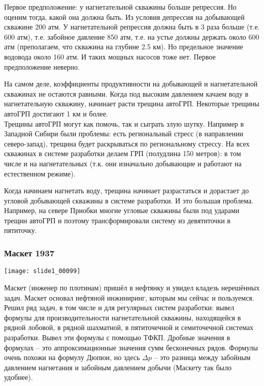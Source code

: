 \documentclass[main.tex]{subfiles}
\begin{document}
Первое предположение: у нагнетательной скважины больше репрессия. Но оценим тогда, какой она должна быть. Из условия депрессия на добывающей скважине 200 атм. У нагнетательной репрессия должна быть в 3 раза больше (т.е. 600 атм), т.е. забойное давление 850 атм, т.е. на устье должны держать около 600 атм (преполагаем, что скважина на глубине 2.5 км).
Но предельное значение водовода около 160 атм. И таких мощных насосов тоже нет. Первое предположение неверно.

На самом деле, коэффициенты продуктивности на добывающей и нагнетательной скважинах не остаются равными. Когда под высоким давлением качаем воду в нагнетательную скважину, начинает расти трещина автоГРП. Некоторые трещины автоГРП достигают 1 км и более.\\

Трещины автоГРП могут как помочь, так и сыграть злую шутку.
Например в Западной Сибири были проблемы: есть региональный стресс (в направлении северо-запад), трещина будет раскрываться по региональному стрессу. На всех скважинах в системе разработки делаем ГРП (полудлина 150 метров): в том числе и на нагнетательных (т.к. они изначально добывающие и работают на естественном режиме).

Когда начинаем нагнетать воду, трещина начинает разрастаться и дорастает до угловой добывающей скважины в системе разработки. И это большая проблема. Например, на севере Приобки многие угловые скважины были под ударами трещин автоГРП и поэтому трансформировали систему из девятиточки в пятиточку.

\subsubsection{Маскет 1937}

\texttt{[image: slide1\_00099]}

Маскет (инженер по плотинам) пришёл в нефтянку и увидел кладезь нерешённых задач. Маскет основал нефтяной инжиниринг, которым мы сейчас и пользуемся.\\

Решил ряд задач, в том числе и для регулярных систем разработки: вывел формулы для производительности нагнетательной скважины, находящейся в рядной лобовой, в рядной шахматной, в пятиточечной и семиточечной системах разработки. Вывел эти формулы с помощью ТФКП. Дробные значения в формулах -- это аппроксимационные значения сумм бесконечных рядов. Формулы очень похожи на формулу Дюпюи, но здесь $\Delta p$ -- это разница между забойным давлением нагнетания и забойным давлением добычи (Маскету так было удобнее).\\
\end{document}
